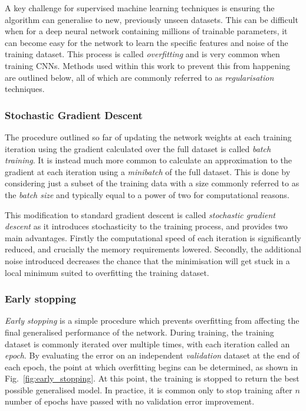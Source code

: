 A key challenge for supervised machine learning techniques is ensuring the algorithm can
generalise to new, previously unseen datasets. This can be difficult when for a deep neural
network containing millions of trainable parameters, it can become easy for the network to learn
the specific features and noise of the training dataset. This process is called \emph{overfitting}
and is very common when training CNNs. Methods used within this work to prevent this from
happening are outlined below, all of which are commonly referred to as \emph{regularisation}
techniques.

\subsubsection*{Stochastic Gradient Descent} %

The procedure outlined so far of updating the network weights at each training iteration using the
gradient calculated over the full dataset is called \emph{batch training}. It is instead much more
common to calculate an approximation to the gradient at each iteration using a \emph{minibatch} of
the full dataset. This is done by considering just a subset of the training data with a size
commonly referred to as the \emph{batch size} and typically equal to a power of two for
computational reasons.

This modification to standard gradient descent is called \emph{stochastic gradient descent} as it
introduces stochasticity to the training process, and provides two main advantages. Firstly the
computational speed of each iteration is significantly reduced, and crucially the memory
requirements lowered. Secondly, the additional noise introduced decreases the chance that the
minimisation will get stuck in a local minimum suited to overfitting the training dataset.

\subsubsection*{Early stopping} %

\emph{Early stopping} is a simple procedure which prevents overfitting from affecting the final
generalised performance of the network. During training, the training dataset is commonly iterated
over multiple times, with each iteration called an \emph{epoch}. By evaluating the error on an
independent \emph{validation} dataset at the end of each epoch, the point at which overfitting
begins can be determined, as shown in Fig.~\ref{fig:early_stopping}. At this point, the training
is stopped to return the best possible generalised model. In practice, it is common only to stop
training after $n$ number of epochs have passed with no validation error improvement.

